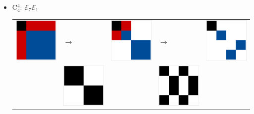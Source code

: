 \documentclass[11pt,dvipsnames]{article} %
\newcommand{\E}{\mathcal{E}}
\newcommand{\1}{\mathds{1}}
\begin{document}
\begin{itemize}
\begin{itemize}
\item C$_4^4$: $\E_7\E_1$\newline
\begin{tabular}{m{2cm} m{2cm} m{2cm} m{2cm} m{2cm}}
\includegraphics[width=2.2cm]{img-JA/id}  
& \hspace{0.8cm}$\longrightarrow$ 
& \includegraphics[width=2.2cm]{img-JA/8comp} 
& \hspace{0.8cm}$\longrightarrow$ 
& \includegraphics[width=2.2cm]{img-JA/4comp}\\ 
 & \includegraphics[width=2.2cm]{img-JA/16To8} &  
 & \includegraphics[width=2.2cm]{img-JA/8To4} &\\ 
\end{tabular} 
\end{itemize}



\end{itemize}
\end{document}
